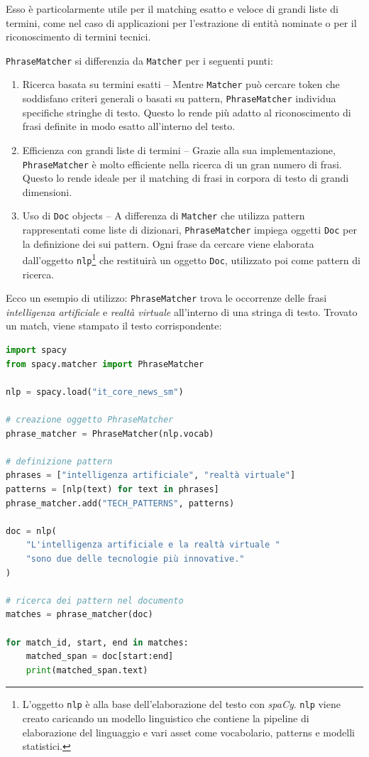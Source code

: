 \documentclass[12pt]{report}
\newcommand{\spacy}{\textsl{spaCy}\xspace}
\begin{document}
Esso è particolarmente utile per il matching esatto e veloce di grandi liste di termini, come nel caso di applicazioni per l'estrazione di entità nominate o per il riconoscimento di termini tecnici.

\texttt{PhraseMatcher} si differenzia da \texttt{Matcher} per i seguenti punti:

\begin{enumerate}
\item \textsf{Ricerca basata su termini esatti} -- Mentre \texttt{Matcher} può cercare token che soddisfano criteri generali o basati su pattern, \texttt{PhraseMatcher} individua specifiche stringhe di testo. Questo lo rende più adatto al riconoscimento di frasi definite in modo esatto all'interno del testo.
\item \textsf{Efficienza con grandi liste di termini} -- Grazie alla sua implementazione, \texttt{PhraseMatcher} è molto efficiente nella ricerca di un gran numero di frasi. Questo lo rende ideale per il matching di frasi in corpora di testo di grandi dimensioni.
\item \textsf{Uso di \texttt{Doc} objects} -- A differenza di \texttt{Matcher} che utilizza pattern rappresentati come liste di dizionari, \texttt{PhraseMatcher} impiega oggetti \texttt{Doc} per la definizione dei sui pattern. Ogni frase da cercare viene elaborata dall'oggetto \texttt{nlp}\footnote{L'oggetto \texttt{nlp} è alla base dell'elaborazione del testo con \spacy. \texttt{nlp} viene creato caricando un modello linguistico che contiene la pipeline di elaborazione del linguaggio e vari asset come vocabolario, patterns e modelli statistici.} che restituirà un oggetto \texttt{Doc}, utilizzato poi come pattern di ricerca.
\end{enumerate}


\begin{mdframed}
\small
Ecco un esempio di utilizzo: \texttt{PhraseMatcher} trova le occorrenze delle frasi \textit{intelligenza artificiale} e \textit{realtà virtuale} all'interno di una stringa di testo. Trovato un match, viene stampato il testo corrispondente:

\begin{lstlisting}[language=Python]
import spacy
from spacy.matcher import PhraseMatcher

nlp = spacy.load("it_core_news_sm")

# creazione oggetto PhraseMatcher
phrase_matcher = PhraseMatcher(nlp.vocab)

# definizione pattern
phrases = ["intelligenza artificiale", "realtà virtuale"]
patterns = [nlp(text) for text in phrases]
phrase_matcher.add("TECH_PATTERNS", patterns)

doc = nlp(
    "L'intelligenza artificiale e la realtà virtuale "
    "sono due delle tecnologie più innovative."
)

# ricerca dei pattern nel documento
matches = phrase_matcher(doc)

for match_id, start, end in matches:
    matched_span = doc[start:end]
    print(matched_span.text)
\end{lstlisting}
\end{mdframed}
\end{document}
